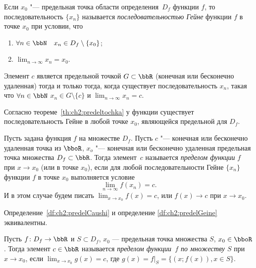 \begin{defn}
Если $x_0$ "--- предельная точка области определения~$D_f$ функции $f$, то последовательность $\{x_n\}$ называется \textit{последовательностью Гейне} функции $f$ в точке $x_0$ при условии, что
\begin{enumerate}
\item $\forall n \in \bbN\quad x_n\in D_f\setminus \{x_0\}$;
\item $\lim_{n \to \infty}\limits x_n = x_0$.
\end{enumerate}
\end{defn}

\begin{thm}
\label{th:ch2:predeltochka}
Элемент $c$ является предельной точкой $G\subset \bbR$ (конечная или бесконечно удаленная) тогда и только тогда, когда существует последовательность ${x_n}$, такая что $\forall n \in \bbN$ $x_n \in G\setminus\{c\}$ и $\lim_{n \to \infty}\limits x_n = c$. 
\end{thm}

Согласно теореме~\ref{th:ch2:predeltochka} у функции существует последовательность Гейне в любой точке $x_0$, являющейся предельной для $D_f$.

\begin{defn}\label{df:ch2:predelGeine}
Пусть задана функция $f$ на множестве $D_f$. Пусть $c$ "--- конечная или бесконечно удаленная точка из $\bboR$, $x_o$ "--- конечная или бесконечно удаленная предельная точка  множества $D_f \subset \bbR$. Тогда элемент~$c$ называется \textit{пределом функции} $f$ при $x \to x_0$ (или в точке $x_0$), если для любой последовательности Гейне $\{x_n\}$ функции $f$ в точке $x_0$ выполняется условие 
$$\lim_{n \to \infty}\limits f(x_n) = c.$$ 
И в этом случае будем писать $\lim_{x \to x_0}\limits f(x) = c$, или $f(x)\to c$ при $x \to x_0$.
\end{defn}

\begin{thm}
Определение~\ref{df:ch2:predelCaushi} и определение \ref{df:ch2:predelGeine} эквивалентны.
\end{thm}

\begin{defn}
Пусть $f\colon D_f \to \bbR$ и $S \subset D_f$, $x_0$ --- предельная точка множества $S$, $x_0 \in \bboR$. Тогда элемент $c \in \bbR$ называется \textit{пределом функции~$f$ по множеству $S$} при $x \to x_0$, если $\lim_{x \to x_0}\limits g(x) = c$, где $g(x)=\left.f\right|_S = \{(x;f(x)),x \in S\}$.
\end{defn}


